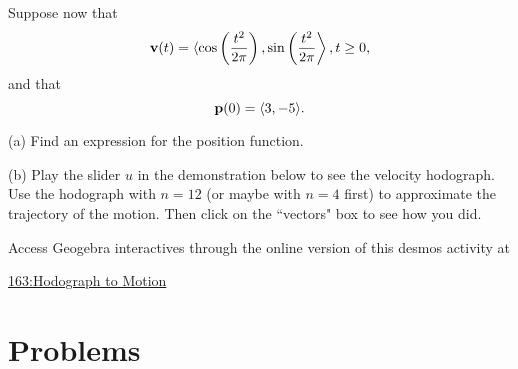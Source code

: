 \documentclass{ximera}
\begin{document}
\begin{question}  \label{Qdeggbfr4}
Suppose now that 
\[
    {\bf v}(t) = \langle \cos\left( \frac{t^2}{2\pi} \right) , \sin\left( \frac{t^2}{2\pi} \right \rangle , t\geq 0 ,
\]
and that 
\[
{\bf p}(0) = \langle 3, -5 \rangle .
\]

(a) Find an expression for the position function.

(b) Play the slider $u$ in the demonstration below to see the velocity hodograph. Use the hodograph with $n=12$ (or maybe with $n=4$ first) to approximate the trajectory of the motion. Then click on the ``vectors" box to see how you did.

\begin{exploration}   \label{E67ugfdgtrt}
\begin{onlineOnly}
    \begin{center}
\end{center}
\end{onlineOnly}


Access Geogebra interactives through the online version of this desmos activity at

\href{https://www.geogebra.org/classic/pdefd7mb}{163:Hodograph to Motion}

\end{exploration}

\end{question}




\section{Problems}
\end{document}
